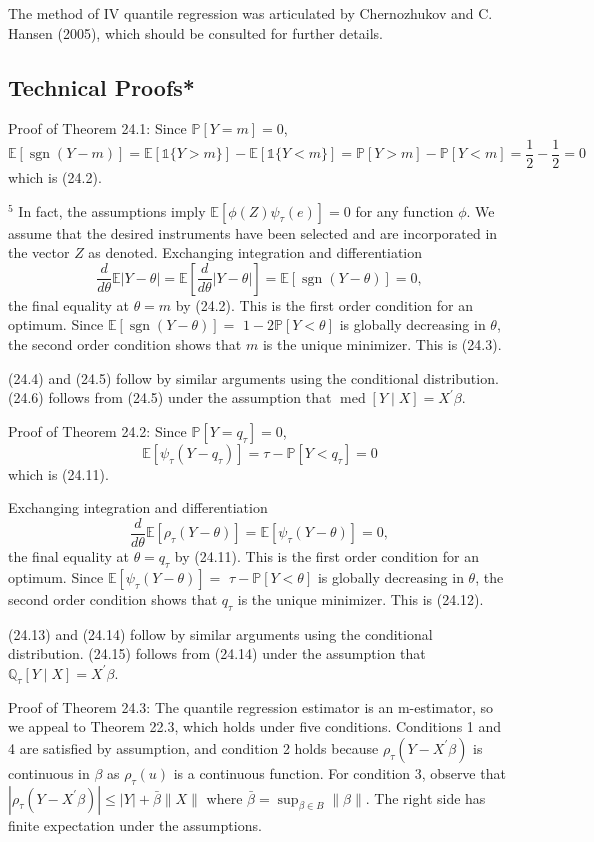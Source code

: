 \documentclass[10pt]{article}
\begin{document}
The method of IV quantile regression was articulated by Chernozhukov and C. Hansen (2005), which should be consulted for further details.

\subsection{Technical Proofs*}
Proof of Theorem 24.1: Since $\mathbb{P}[Y=m]=0$,
$$
\mathbb{E}[\operatorname{sgn}(Y-m)]=\mathbb{E}[\mathbb{1}\{Y>m\}]-\mathbb{E}[\mathbb{1}\{Y<m\}]=\mathbb{P}[Y>m]-\mathbb{P}[Y<m]=\frac{1}{2}-\frac{1}{2}=0
$$
which is (24.2).

${ }^{5}$ In fact, the assumptions imply $\mathbb{E}\left[\phi(Z) \psi_{\tau}(e)\right]=0$ for any function $\phi$. We assume that the desired instruments have been selected and are incorporated in the vector $Z$ as denoted. Exchanging integration and differentiation
$$
\frac{d}{d \theta} \mathbb{E}|Y-\theta|=\mathbb{E}\left[\frac{d}{d \theta}|Y-\theta|\right]=\mathbb{E}[\operatorname{sgn}(Y-\theta)]=0,
$$
the final equality at $\theta=m$ by (24.2). This is the first order condition for an optimum. Since $\mathbb{E}[\operatorname{sgn}(Y-\theta)]=$ $1-2 \mathbb{P}[Y<\theta]$ is globally decreasing in $\theta$, the second order condition shows that $m$ is the unique minimizer. This is (24.3).

(24.4) and (24.5) follow by similar arguments using the conditional distribution. (24.6) follows from (24.5) under the assumption that $\operatorname{med}[Y \mid X]=X^{\prime} \beta$.

Proof of Theorem 24.2: Since $\mathbb{P}\left[Y=q_{\tau}\right]=0$,
$$
\mathbb{E}\left[\psi_{\tau}\left(Y-q_{\tau}\right)\right]=\tau-\mathbb{P}\left[Y<q_{\tau}\right]=0
$$
which is (24.11).

Exchanging integration and differentiation
$$
\frac{d}{d \theta} \mathbb{E}\left[\rho_{\tau}(Y-\theta)\right]=\mathbb{E}\left[\psi_{\tau}(Y-\theta)\right]=0,
$$
the final equality at $\theta=q_{\tau}$ by (24.11). This is the first order condition for an optimum. Since $\mathbb{E}\left[\psi_{\tau}(Y-\theta)\right]=$ $\tau-\mathbb{P}[Y<\theta]$ is globally decreasing in $\theta$, the second order condition shows that $q_{\tau}$ is the unique minimizer. This is (24.12).

(24.13) and (24.14) follow by similar arguments using the conditional distribution. (24.15) follows from (24.14) under the assumption that $\mathbb{Q}_{\tau}[Y \mid X]=X^{\prime} \beta$.

Proof of Theorem 24.3: The quantile regression estimator is an m-estimator, so we appeal to Theorem 22.3, which holds under five conditions. Conditions 1 and 4 are satisfied by assumption, and condition 2 holds because $\rho_{\tau}\left(Y-X^{\prime} \beta\right)$ is continuous in $\beta$ as $\rho_{\tau}(u)$ is a continuous function. For condition 3, observe that $\left|\rho_{\tau}\left(Y-X^{\prime} \beta\right)\right| \leq|Y|+\bar{\beta}\|X\|$ where $\bar{\beta}=\sup _{\beta \in B}\|\beta\|$. The right side has finite expectation under the assumptions.
\end{document}
